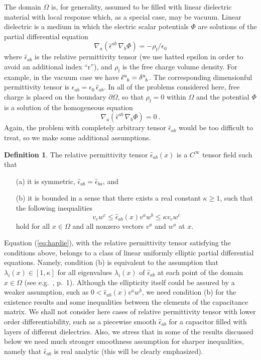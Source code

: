 \documentclass[12pt]{iopart}
\newcommand{\dd}{\partial}
\newcommand{\nab}[1]{\nabla_{\! #1}}
\newcommand{\be}{\begin{equation}}
\newcommand{\ee}{\end{equation}}
\newcommand{\0}{\vct{0}}
\theoremstyle{plain} \newtheorem{tm}{Theorem}[section]
\theoremstyle{plain} \newtheorem{lm}[tm]{Lemma}
\theoremstyle{definition} \newtheorem{defn}[tm]{Definition}
\newcommand{\bdefn}{\begin{defn}}
\newcommand{\edefn}{\end{defn}}
\begin{document}
\medskip



The domain $\Omega$ is, for generality, assumed to be filled with linear dielectric material with local response which, as a special case, may be vacuum. Linear dielectric is a medium in which the electric scalar potentials $\Phi$ are solutions of the partial differential equation
\be
\nab{a} (\hat{\epsilon}^{ab} \, \nab{b}\Phi) = -\rho_{\mathrm{f}}/\epsilon_0
\ee
where $\hat{\epsilon}_{ab}$ is the relative permittivity tensor (we use hatted epsilon in order to avoid an additional index ``r''), and $\rho_{\mathrm{f}}$ is the free charge volume density. For example, in the vacuum case we have $\tensor{\hat{\epsilon}}{^a_b} = \tensor{\delta}{^a_b}$. The corresponding dimensionful permittivity tensor is $\epsilon_{ab} = \epsilon_0 \, \hat{\epsilon}_{ab}$. In all of the problems considered here, free charge is placed on the boundary $\dd\Omega$, so that $\rho_{\mathrm{f}} = 0$ within $\Omega$ and the potential $\Phi$ is a solution of the homogeneous equation 
\be\label{eq:hardie}   %
\nab{a} (\hat{\epsilon}^{ab} \, \nab{b}\Phi) = 0 \ .
\ee
Again, the problem with completely arbitrary tensor $\hat{\epsilon}_{ab}$ would be too difficult to treat, so we make some additional assumptions. 

\medskip

\bdefn
The relative permittivity tensor $\hat{\epsilon}_{ab}(x)$ is a $C^\infty$ tensor field such that
\begin{itemize}
\item[(a)] it is symmetric, $\hat{\epsilon}_{ab} = \hat{\epsilon}_{ba}$, and

\item[(b)] it is bounded in a sense that there exists a real constant $\kappa \ge 1$, such that the following inequalities
\be\label{eps}
v_c w^c \le \hat{\epsilon}_{ab}(x) v^a w^b \le \kappa v_c w^c
\ee
hold for all $x \in \Omega$ and all nonzero vectors $v^a$ and $w^a$ at $x$.
\end{itemize}
\edefn

\noindent
Equation (\ref{eq:hardie}), with the relative permittivity tensor satisfying the conditions above, belongs to a class of linear uniformly elliptic partial differential equations. Namely, condition (b) is equivalent to the assumption that $\lambda_i(x) \in [1,\kappa]$ for all eigenvalues $\lambda_i(x)$ of $\hat{\epsilon}_{ab}$ at each point of the domain $x \in \Omega$ (see e.g.~\cite{GT}, p.~1). Although the ellipticity itself could be assured by a weaker assumption, such as $0 < \hat{\epsilon}_{ab}(x) v^a w^b$, we need condition (b) for the existence results and some inequalities between the elements of the capacitance matrix. We shall not consider here cases of relative permittivity tensor with lower order differentiability, such as a piecewise smooth $\hat{\epsilon}_{ab}$ for a capacitor filled with layers of different dielectrics. Also, we stress that in some of the results discussed below we need much stronger smoothness assumption for sharper inequalities, namely that $\hat{\epsilon}_{ab}$ is real analytic (this will be clearly emphasized).
\end{document}
